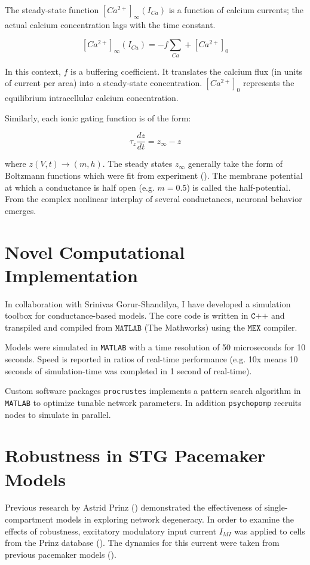 \documentclass[14pt]{article}
\begin{document}
	The steady-state function $[Ca^{2+}]_{\infty}(I_{Ca})$ is a function of calcium currents; the actual calcium concentration  lags with the time constant.
	
	\[[Ca^{2+}]_{\infty}(I_{Ca}) = -f \sum_{Ca} + [Ca^{2+}]_{0} \]
	
	In this context, $f$ is a buffering coefficient. It translates the calcium flux (in units of current per area) into a steady-state concentration. $[Ca^{2+}]_0$ represents the equilibrium intracellular calcium concentration.
	
	Similarly, each ionic gating function is of the form:
	
	\[\tau_{z} \frac{dz}{dt} = z_{\infty} - z \]
	
	where $z(V,t) \rightarrow (m,h)$. The steady states $z_\infty$ generally take the form of Boltzmann functions which were fit from experiment (\cite{TurrigianoSelectiveregulationcurrent1995}). The membrane potential at which a conductance is half open (e.g. $m=0.5$) is called the half-potential.  From the complex nonlinear interplay of several conductances, neuronal behavior emerges.
	
	\section{Novel Computational Implementation}
	In collaboration with Srinivas Gorur-Shandilya, I have developed a simulation toolbox for conductance-based models. The core code is written in $\texttt{C++}$ and transpiled and compiled from $\texttt{MATLAB}$ (The Mathworks) using the $\texttt{MEX}$ compiler.
	
	Models were simulated in \texttt{MATLAB} with a time resolution of 50 microseconds for 10 seconds. Speed is reported in ratios of real-time performance (e.g. 10x means 10 seconds of simulation-time was completed in 1 second of real-time).
	
	Custom software packages \texttt{procrustes} implements a pattern search algorithm in \texttt{MATLAB} to optimize tunable network parameters. In addition \texttt{psychopomp} recruits nodes to simulate in parallel.
	
	\section{Robustness in STG Pacemaker Models}
	Previous research by Astrid Prinz (\cite{PrinzAlternativehandtuningconductancebased2003,PrinzSimilarnetworkactivity2004}) demonstrated the effectiveness of single-compartment models in exploring network degeneracy. In order to examine the effects of robustness, excitatory modulatory input current $I_{MI}$ was applied to cells from the Prinz database (\cite{PrinzAlternativehandtuningconductancebased2003}). The dynamics for this current were taken from previous pacemaker models (\cite{CaplanManyParameterSets2014}).
	
\end{document}
